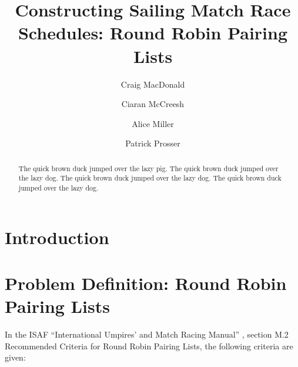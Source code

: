 \documentclass{llncs}
\begin{document}
\title{Constructing Sailing Match Race Schedules: Round Robin Pairing Lists}
\author{Craig MacDonald \and Ciaran McCreesh \and Alice Miller \and Patrick Prosser}
\maketitle

\begin{abstract} 
The quick brown duck jumped over the lazy pig. The quick brown duck jumped over the lazy dog. The quick brown duck jumped over the lazy dog. The quick brown duck jumped over the lazy dog.
\end{abstract}

\section{Introduction}

\section{Problem Definition: Round Robin Pairing Lists}

In the ISAF ``International Umpires' and Match Racing Manual'' \cite{isaf}, section
M.2 Recommended Criteria for Round Robin Pairing Lists, the following criteria
are given:
\end{document}
